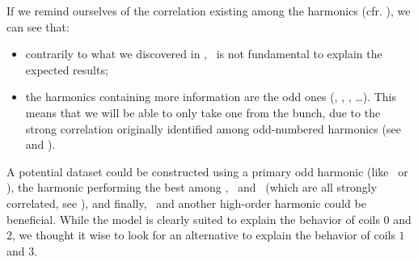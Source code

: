 \noindent If we remind ourselves of the correlation existing among the harmonics (cfr. ), we can see that:
\begin{itemize}
	\item contrarily to what we discovered in , \an[2]\ is not
	      fundamental to explain the expected results;
	\item the harmonics containing more information are the odd ones (\an[1], \an[3], \an[5],
	      \ldots). This means that we will be able to only take one from the bunch, due to the
	      strong correlation originally identified among odd-numbered harmonics (see
		 and ).
\end{itemize}
A potential dataset could be constructed using a primary odd harmonic (like \an[1]\ or \an[3]), the
harmonic performing the best among \an[4], \an[8]\ and \an[12]\ (which are all strongly correlated,
see ), and finally, \an[2]\ and another high-order harmonic could be beneficial. While
the model is clearly suited to explain the behavior of coils $0$ and $2$, we thought it wise to
look for an alternative to explain the behavior of coils $1$ and $3$.
